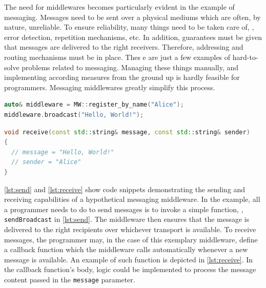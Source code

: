 The need for middlewares becomes particularly evident in the example of messaging. Messages need to be sent over a physical mediums which are often, by nature, unreliable. To ensure reliability, many things need to be taken care of, \eg , error detection, repetition mechanisms, etc. In addition, guarantees must be given that messages are delivered to the right receivers. Therefore, addressing and routing mechanisms must be in place. Thes
e are just a few examples of hard-to-solve problems related to messaging. Managing these things manually, and implementing according measures from the ground up is hardly feasible for programmers. Messaging middlewares greatly simplify this process. 
\begin{lstlisting}[title={Middleware send example}, caption={An exemplary code snippet demonstrating a broadcast dispatch via middleware}, label={lst:send}, language={C++}]
auto& middleware = MW::register_by_name("Alice");
middleware.broadcast("Hello, World!");
\end{lstlisting}
\begin{lstlisting}[title={Middleware receive example}, caption={An exemplary callback function to receive messages via middleware}, label={lst:receive}, language={C++}]
void receive(const std::string& message, const std::string& sender) 
{ 
  // message = "Hello, World!"
  // sender = "Alice"    
}
\end{lstlisting}
\autoref{lst:send} and \autoref{lst:receive} show code snippets demonstrating the sending and receiving capabilities of a hypothetical messaging middleware. In the example, all a programmer needs to do to send messages is to invoke a simple function, \eg , \texttt{sendBroadcast} in \autoref{lst:send}. The middleware then ensures that the message is delivered to the right recipients over whichever transport is available. To receive messages, the programmer may, in the case of this exemplary middleware, define a callback function which the middleware calls automatically whenever a new message is available. An example of such function is depicted in \autoref{lst:receive}. In the callback function's body, logic could be implemented to process the message content passed in the \texttt{message} parameter.

%
%
%
%
%
%
%
%
%
%

